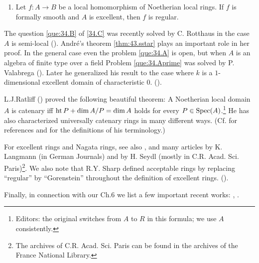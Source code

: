 \documentclass[../main]{subfiles}
\begin{document}
\begin{enumerate}[label=$(**)$]
    \item\label{thm:43.sstar} Let $f: A\longrightarrow B$ be a local homomorphism of Noetherian local rings. If $f$ is formally smooth and $A$ is excellent, then $f$ is regular.
\end{enumerate}
The question \ref{que:34.B} of \ref{34.C} was recently solved by C. Rotthaus in the case $A$ is semi-local (\cite{rotthaus1979komplettierung}). André's theorem \ref{thm:43.sstar} plays an important role in her proof. In the general case even the problem \ref{que:34.A} is open, but when $A$ is an algebra of finite type over a field Problem \ref{que:34.Aprime} was solved by P. Valabrega (\cite{valabrega1975on}). Later he generalized his result to the case where $k$ is a $1$-dimensional excellent domain of characteristic $0$. (\cite{valabrega1976a}).

L.J.Ratliff (\cite{ratliff1972catenary}) proved the following beautiful theorem: A Noetherian local domain $A$ is catenary iff $\operatorname{ht} P+\operatorname{dim} A/P=\operatorname{dim} A$ holds for every $P \in\operatorname{Spec}(A)$.\footnote{Editors: the original switches from $A$ to $R$ in this formula; we use $A$ consistently.} He has also characterized universally catenary rings in many different ways. (Cf. \cite{ratliff1978chain} for references and for the definitions of his terminology.)

For excellent rings and Nagata rings, see also \cite{greco1976two}, and many articles by K. Langmann (in German Journals) and by H. Seydl (mostly in C.R. Acad. Sci. Paris)\footnote{The archives of C.R. Acad. Sci. Paris can be found in the archives of the France National Library.}. We also note that R.Y. Sharp defined acceptable rings by replacing ``regular'' by ``Gorenstein'' throughout the definition of excellent rings. (\cite{sharp1977acceptable}).

Finally, in connection with our Ch.6 we list a few important recent works: \cite{northcott1976finite}, \cite{peskineszpiro1973dimension}
\cite{hochster1975topics}.
\end{document}
